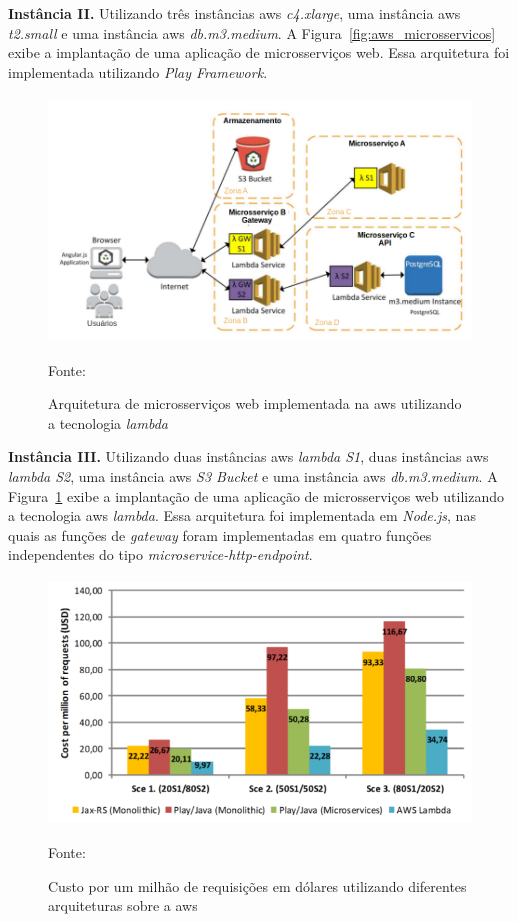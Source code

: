 \textbf{Instância II.} Utilizando três instâncias \ac{aws} \textit{c4.xlarge}, uma instância \ac{aws} \textit{t2.small} e uma instância \ac{aws} \textit{db.m3.medium}.
%
A Figura~\ref{fig:aws_microsservicos} exibe a implantação de uma aplicação de microsserviços web. Essa arquitetura foi implementada utilizando \textit{Play Framework}. %



\begin{figure}[htb!]
\caption{Arquitetura de microsserviços web implementada na \ac{aws} utilizando a tecnologia \textit{lambda}}
\label{fig:aws_lambda}
\includegraphics[height=6.5cm]{img/cap2/aws_lambda.png}
\centering

Fonte:~\cite{7515686}
\end{figure}

\textbf{Instância III.} Utilizando duas instâncias \ac{aws} \textit{lambda S1}, duas instâncias \ac{aws} \textit{lambda S2}, uma instância \ac{aws} \textit{S3 Bucket} e uma instância \ac{aws} \textit{db.m3.medium}.
%
A Figura~\ref{fig:aws_lambda} exibe a implantação de uma aplicação de microsserviços web utilizando a tecnologia \ac{aws} \textit{lambda}. Essa arquitetura foi implementada em \textit{Node.js}, nas quais as funções de \textit{gateway} foram implementadas em quatro funções independentes do tipo \textit{microservice-http-endpoint}. %



\begin{figure}[htb!]
\caption{Custo por um milhão de requisições em dólares utilizando diferentes arquiteturas sobre a \ac{aws}}
\label{fig:custo_aws}
\includegraphics[height=6.5cm]{img/cap2/custo_aws.png}
\centering

Fonte:~\cite{7515686}
\end{figure}



